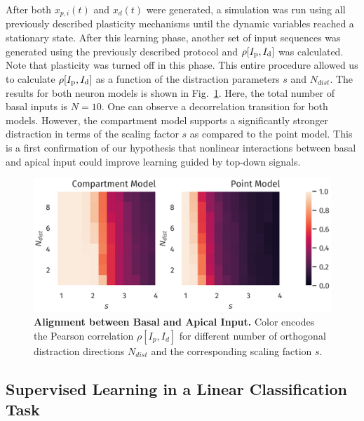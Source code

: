 \documentclass[10pt,a4paper,twocolumn]{article}
\begin{document}
		After both $x_{p,i}(t)$ and $x_d(t)$ were generated,
		a simulation was run using all previously described plasticity
		mechanisms until the dynamic variables reached a stationary state.
		After this learning phase, another set of input sequences was generated
		using the previously described protocol and $\rho[I_{\rm p},I_{\rm d}]$ was calculated.
		Note that plasticity was turned off in this phase. This entire procedure
		allowed us to calculate $\rho[I_{\rm p},I_{\rm d}]$ as a function of the distraction
		parameters $s$ and $N_{dist}$. The results for both neuron models 
		is shown in Fig.~\ref{fig:corr_dimension_scaling}. Here, the total number of 
		basal inputs is $N=10$. One can observe a decorrelation transition for 
		both models. However, the compartment model supports a significantly stronger
		distraction in terms of the scaling factor $s$ as compared to the point model.
		This is a first confirmation of our hypothesis that nonlinear interactions
		between basal and apical input could improve learning guided by top-down signals.
		
		\begin{figure}
			\includegraphics[width=\columnwidth]{corr_dimension_scaling}
			\caption{{\bf Alignment between Basal and Apical Input.} Color
			encodes the Pearson correlation $\rho[I_p,I_d]$ for different
			number of orthogonal distraction directions $N_{dist}$ 
			and the corresponding scaling faction $s$.}
			\label{fig:corr_dimension_scaling}
		\end{figure}
		
		\subsection{Supervised Learning in a Linear Classification Task}
		\label{sect:classification}
		
\end{document}

